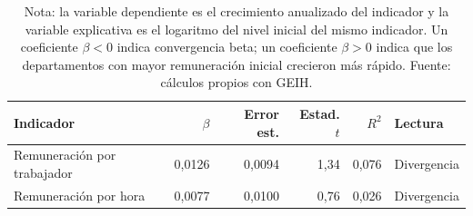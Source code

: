 \begin{table}[H]
\centering
\caption{Convergencia beta de la remuneración laboral departamental, 2009--2025}
\label{tab:dept_remuneracion_convergencia_24}
\small
\begin{tabular}{lrrrrl}
\toprule
Indicador & $\beta$ & Error est. & Estad. $t$ & $R^2$ & Lectura \\
\midrule
Remuneración por trabajador & 0,0126 & 0,0094 & 1,34 & 0,076 & Divergencia \\
Remuneración por hora & 0,0077 & 0,0100 & 0,76 & 0,026 & Divergencia \\
\bottomrule
\end{tabular}
\caption*{\footnotesize Nota: la variable dependiente es el crecimiento anualizado del indicador y la variable explicativa es el logaritmo del nivel inicial del mismo indicador. Un coeficiente $\beta<0$ indica convergencia beta; un coeficiente $\beta>0$ indica que los departamentos con mayor remuneración inicial crecieron más rápido. Fuente: cálculos propios con GEIH.}
\end{table}
